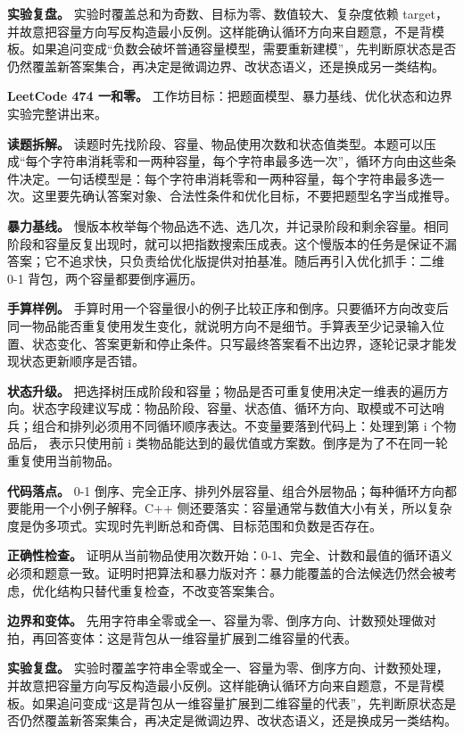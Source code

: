 \textbf{实验复盘。} 实验时覆盖总和为奇数、目标为零、数值较大、复杂度依赖 target，并故意把容量方向写反构造最小反例。这样能确认循环方向来自题意，不是背模板。如果追问变成“负数会破坏普通容量模型，需要重新建模”，先判断原状态是否仍然覆盖新答案集合，再决定是微调边界、改状态语义，还是换成另一类结构。

\noindent\textbf{LeetCode 474 一和零。} 工作坊目标：把题面模型、暴力基线、优化状态和边界实验完整讲出来。

\textbf{读题拆解。} 读题时先找阶段、容量、物品使用次数和状态值类型。本题可以压成“每个字符串消耗零和一两种容量，每个字符串最多选一次”，循环方向由这些条件决定。一句话模型是：每个字符串消耗零和一两种容量，每个字符串最多选一次。这里要先确认答案对象、合法性条件和优化目标，不要把题型名字当成推导。

\textbf{暴力基线。} 慢版本枚举每个物品选不选、选几次，并记录阶段和剩余容量。相同阶段和容量反复出现时，就可以把指数搜索压成表。这个慢版本的任务是保证不漏答案；它不追求快，只负责给优化版提供对拍基准。随后再引入优化抓手：二维 0-1 背包，两个容量都要倒序遍历。

\textbf{手算样例。} 手算时用一个容量很小的例子比较正序和倒序。只要循环方向改变后同一物品能否重复使用发生变化，就说明方向不是细节。手算表至少记录输入位置、状态变化、答案更新和停止条件。只写最终答案看不出边界，逐轮记录才能发现状态更新顺序是否错。

\textbf{状态升级。} 把选择树压成阶段和容量；物品是否可重复使用决定一维表的遍历方向。状态字段建议写成：物品阶段、容量、状态值、循环方向、取模或不可达哨兵；组合和排列必须用不同循环顺序表达。不变量要落到代码上：处理到第 i 个物品后， 表示只使用前 i 类物品能达到的最优值或方案数。倒序是为了不在同一轮重复使用当前物品。

\textbf{代码落点。} 0-1 倒序、完全正序、排列外层容量、组合外层物品；每种循环方向都要能用一个小例子解释。C++ 侧还要落实：容量通常与数值大小有关，所以复杂度是伪多项式。实现时先判断总和奇偶、目标范围和负数是否存在。

\textbf{正确性检查。} 证明从当前物品使用次数开始：0-1、完全、计数和最值的循环语义必须和题意一致。证明时把算法和暴力版对齐：暴力能覆盖的合法候选仍然会被考虑，优化结构只替代重复检查，不改变答案集合。

\textbf{边界和变体。} 先用字符串全零或全一、容量为零、倒序方向、计数预处理做对拍，再回答变体：这是背包从一维容量扩展到二维容量的代表。

\textbf{实验复盘。} 实验时覆盖字符串全零或全一、容量为零、倒序方向、计数预处理，并故意把容量方向写反构造最小反例。这样能确认循环方向来自题意，不是背模板。如果追问变成“这是背包从一维容量扩展到二维容量的代表”，先判断原状态是否仍然覆盖新答案集合，再决定是微调边界、改状态语义，还是换成另一类结构。

